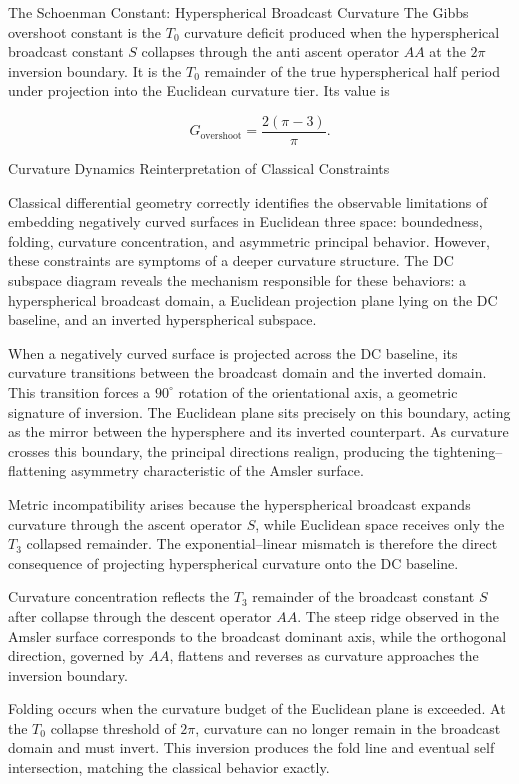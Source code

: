 \documentclass[final,onefignum,onetabnum]{siamart}
\begin{document}
\begin{section}{The Schoenman Constant: Hyperspherical Broadcast Curvature}
The Gibbs overshoot constant is the $T_0$ curvature deficit produced when the hyperspherical broadcast constant $S$ collapses through the anti ascent operator $AA$ at the $2\pi$ inversion boundary. It is the $T_0$ remainder of the true hyperspherical half period under projection into the Euclidean curvature tier. Its value is


\[
G_\text{overshoot} = \frac{2(\pi-3)}{\pi}.
\]

\end{section}

\begin{section}{Curvature Dynamics Reinterpretation of Classical Constraints}

Classical differential geometry correctly identifies the observable limitations of embedding negatively curved surfaces in Euclidean three space: boundedness, folding, curvature concentration, and asymmetric principal behavior. However, these constraints are symptoms of a deeper curvature structure. The DC subspace diagram reveals the mechanism responsible for these behaviors: a hyperspherical broadcast domain, a Euclidean projection plane lying on the DC baseline, and an inverted hyperspherical subspace.

When a negatively curved surface is projected across the DC baseline, its curvature transitions between the broadcast domain and the inverted domain. This transition forces a $90^\circ$ rotation of the orientational axis, a geometric signature of inversion. The Euclidean plane sits precisely on this boundary, acting as the mirror between the hypersphere and its inverted counterpart. As curvature crosses this boundary, the principal directions realign, producing the tightening–flattening asymmetry characteristic of the Amsler surface.

Metric incompatibility arises because the hyperspherical broadcast expands curvature through the ascent operator $S$, while Euclidean space receives only the $T_3$ collapsed remainder. The exponential–linear mismatch is therefore the direct consequence of projecting hyperspherical curvature onto the DC baseline.

Curvature concentration reflects the $T_3$ remainder of the broadcast constant $S$ after collapse through the descent operator $AA$. The steep ridge observed in the Amsler surface corresponds to the broadcast dominant axis, while the orthogonal direction, governed by $AA$, flattens and reverses as curvature approaches the inversion boundary.

Folding occurs when the curvature budget of the Euclidean plane is exceeded. At the $T_0$ collapse threshold of $2\pi$, curvature can no longer remain in the broadcast domain and must invert. This inversion produces the fold line and eventual self intersection, matching the classical behavior exactly.


\end{section}
\end{document}
